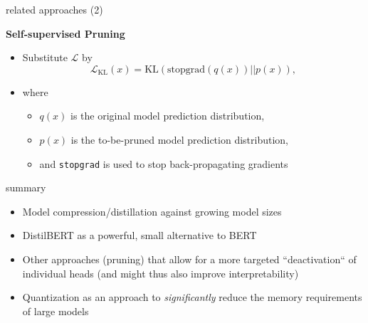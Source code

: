 
\begin{frame}{related approaches (2)}

\vfill

\textbf{Self-supervised Pruning} 

\begin{itemize}
	\item Substitute $\mathcal{L}$ by
							$$\mathcal{L}_{\mathrm{KL}}(x)=\mathrm{KL}(\mathrm{stopgrad}(q(x))||p(x)),$$
	\item where
			\begin{itemize}
				\item $q(x)$ is the original model prediction distribution,
				\item $p(x)$ is the to-be-pruned model prediction distribution,
				\item and \texttt{stopgrad} is used to stop back-propagating gradients
			\end{itemize}
\end{itemize}

\vfill
	
\end{frame}


\begin{frame}{summary}

\vfill

\begin{itemize}
	\item Model compression/distillation against growing model sizes
	\item DistilBERT as a powerful, small alternative to BERT
	\item Other approaches (pruning) that allow for a more targeted ``deactivation`` of individual heads (and might thus also improve interpretability)
	\item Quantization as an approach to \textit{significantly} reduce the memory requirements of large models
\end{itemize}

\vfill
	
\end{frame}



